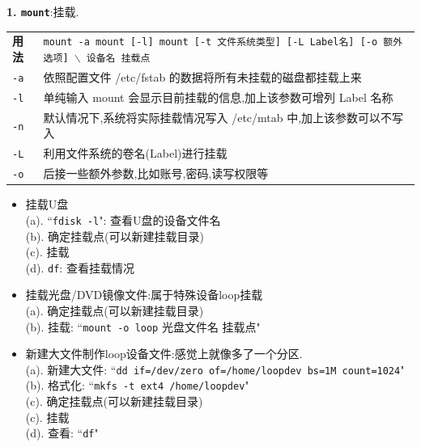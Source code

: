 \par
\textbf{1. \texttt{mount}}:挂载.
\begin{longtable}{l@{: }p{}}\hline\hline
\textbf{用法} & \texttt{mount -a \newline
                mount [-l] \newline
                mount [-t 文件系统类型] [-L Label名] [-o 额外选项] $\backslash$ \newline [-n]  设备名 挂载点} \\

  \texttt{-a} & 依照配置文件 /etc/fstab 的数据将所有未挂载的磁盘都挂载上来 \\

  \texttt{-l} & 单纯输入 mount 会显示目前挂载的信息,加上该参数可增列 Label 名称 \\

  \texttt{-n} & 默认情况下,系统将实际挂载情况写入 /etc/mtab 中,加上该参数可以不写入 \\

  \texttt{-L} & 利用文件系统的卷名(Label)进行挂载 \\

  \texttt{-o} & 后接一些额外参数,比如账号,密码,读写权限等 \\

  \hline
\end{longtable}

\begin{itemize}
 \item 挂载U盘 \\
    (a). ``\texttt{fdisk -l}": 查看U盘的设备文件名\\
    (b). 确定挂载点(可以新建挂载目录)\\
    (c). 挂载 \\
    (d). \texttt{df}: 查看挂载情况

 \item 挂载光盘/DVD镜像文件:属于特殊设备loop挂载 \\
    (a). 确定挂载点(可以新建挂载目录)\\
    (b). 挂载: ``\texttt{mount -o loop} 光盘文件名 挂载点"

 \item 新建大文件制作loop设备文件:感觉上就像多了一个分区. \\
    (a). 新建大文件: ``\texttt{dd if=/dev/zero of=/home/loopdev bs=1M count=1024}" \\
    (b). 格式化: ``\texttt{mkfs -t ext4 /home/loopdev}"\\
    (c). 确定挂载点(可以新建挂载目录)\\
    (c). 挂载 \\
    (d). 查看: ``\texttt{df}"

\end{itemize}


